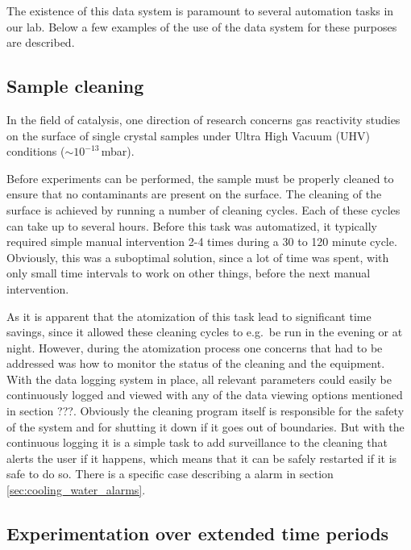 The existence of this data system is paramount to several automation tasks
in our lab. Below a few examples of the use of the data system for
these purposes are described.

\subsection{Sample cleaning}
In the field of catalysis, one direction of research concerns gas
reactivity studies on the surface of single crystal samples under
Ultra High Vacuum (UHV)
conditions ($\sim10^{-13}$\,mbar).

Before experiments can be performed, the sample must be properly
cleaned to ensure that no contaminants are present on the surface. The
cleaning of the surface is achieved by running a number of cleaning
cycles. Each of these cycles can take up to several hours.%
Before this task was automatized, it typically required simple manual
intervention 2-4 times during a 30 to 120 minute cycle. Obviously, this
was a suboptimal solution, since a lot of time was spent, with only
small time intervals to work on other things, before the next manual
intervention.

As it is apparent that the atomization of this task lead to
significant time savings, since it allowed these cleaning cycles to
e.g.\ be run in the evening or at night. However, during the
atomization process one concerns that had to be addressed was how to
monitor the status of the cleaning and the equipment. With the data
logging system in place, all relevant parameters could easily be
continuously logged and viewed with any of the data viewing options
mentioned in section ???. Obviously the cleaning
program itself is responsible for the safety of the system and for
shutting it down if it goes out of boundaries. But with the continuous
logging it is a simple task to add surveillance to the cleaning that
alerts the user if it happens, which means that it can be safely
restarted if it is safe to do so. There is a specific case describing
a alarm in section \ref{sec:cooling_water_alarms}.

\subsection{Experimentation over extended time periods}

